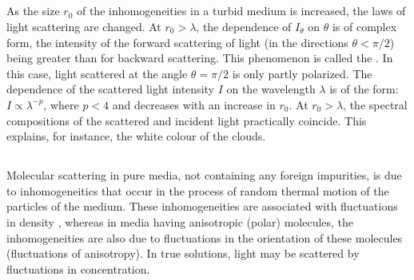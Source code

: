\subsection{}\label{34.3.3} As the size $r_{0}$ of the inhomogeneities in a turbid medium is increased, the laws of light scattering are changed. At $r_{0} > \lambda$,
the dependence of $I_{\theta}$ on $\theta$ is of complex form, the intensity of the forward scattering of light (in the directions $\theta < \pi/2$) being greater than for backward scattering. This phenomenon is called the . In this case, light scattered at the angle $\theta = \pi/2$ is only partly polarized. The dependence of the scattered light intensity $I$ on the wavelength $\lambda$ is of the form: $I \propto \lambda^{-p}$, where $p < 4$ and decreases with an increase in $r_{0}$. At $r_{0} > \lambda$, the spectral compositions of the scattered and incident light practically coincide. This explains, for instance, the white colour
of the clouds.

\subsection{}\label{34.3.4} Molecular scattering in pure media, not containing any foreign impurities, is due to inhomogeneitics that occur in the process of random thermal motion of the particles of the medium. These inhomogeneities are associated with fluctuations in density , whereas in media having anisotropic (polar) molecules,
the inhomogeneities are also due to fluctuations in the
orientation of these molecules (fluctuations of anisotropy). In
true solutions, light may be scattered by fluctuations in concentration.

